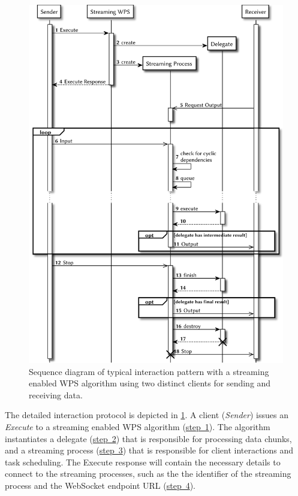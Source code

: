     \begin{figure}[!htb]
      \centering
      \includegraphics[width=0.82253521126760565\linewidth]{figures/sequence-diagramm-swps.pdf}
      \caption{\label{fig:sd:swps}Sequence diagram of typical interaction pattern with a streaming enabled WPS algorithm using two distinct clients for sending and receiving data.}
    \end{figure}

    The detailed interaction protocol is depicted in \cref{fig:sd:swps}. A client (\emph{Sender}) issues an \emph{Execute} to a streaming enabled WPS algorithm (\hyperref[fig:sd:swps]{step~1}). The algorithm instantiates a delegate (\hyperref[fig:sd:swps]{step~2}) that is responsible for processing data chunks, and a streaming process (\hyperref[fig:sd:swps]{step~3}) that is responsible for client interactions and task scheduling. The Execute response will contain the necessary details to connect to the streaming processes, such as the the identifier of the streaming process and the WebSocket endpoint URL (\hyperref[fig:sd:swps]{step~4}).

